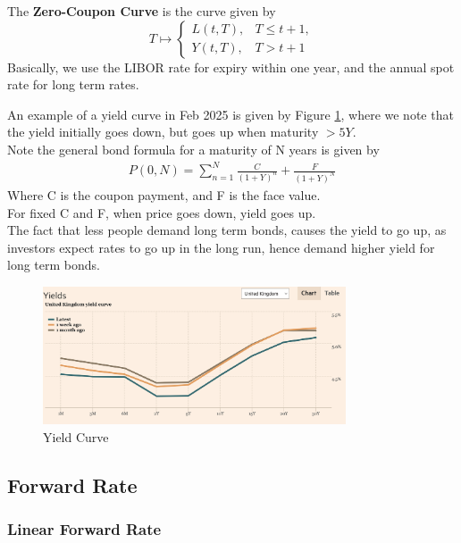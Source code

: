 \begin{definition}
    The \textbf{Zero-Coupon Curve} is the curve given by
$$
    T \mapsto 
\begin{cases} 
    L(t, T), &  T \leq t+1, \\
    Y(t, T), & T > t + 1
\end{cases}
$$
Basically, we use the LIBOR rate for expiry within one year, 
and the annual spot rate for long term rates.

An example of a yield curve in Feb 2025 is given by Figure \ref{fig:yield_curve},
where we note that the yield initially goes down, but goes up when 
maturity $>5Y$.\\
Note the general bond formula for a maturity of N years is given by
\begin{align*}
    P(0, N) = \sum_{n=1}^N \frac{C}{(1 + Y)^n} + \frac{F}{(1 + Y)^N}
\end{align*}
Where C is the coupon payment, and F is the face value.\\
For fixed C and F, when price goes down, yield goes up.\\
The fact that less people demand long term bonds,
causes the yield to go up, as investors expect rates to go up in the long run, 
hence demand higher yield for long term bonds.

\begin{figure}
    \centering
    \includegraphics[width=0.8\textwidth]{plots/yield_curve.png}
    \caption{Yield Curve}
    \label{fig:yield_curve}
\end{figure}
\end{definition}

\subsection{Forward Rate}

\subsubsection{Linear Forward Rate}

